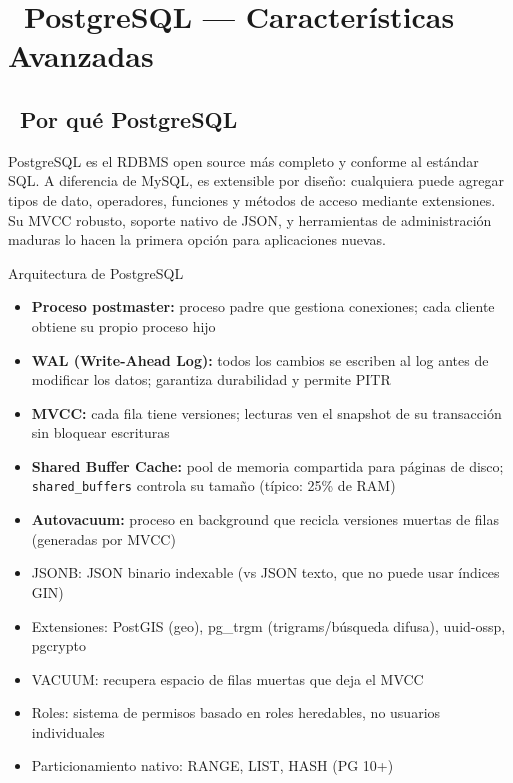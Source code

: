 \chapter[PostgreSQL --- Características Avanzadas]{~PostgreSQL --- Características Avanzadas}

\section[Por qué PostgreSQL]{~Por qué PostgreSQL}

PostgreSQL es el RDBMS open source más completo y conforme al estándar SQL.
A diferencia de MySQL, es extensible por diseño: cualquiera puede agregar tipos de dato, operadores, funciones y métodos de acceso mediante extensiones.
Su MVCC robusto, soporte nativo de JSON, y herramientas de administración maduras lo hacen la primera opción para aplicaciones nuevas.

\begin{teoriabox}{Arquitectura de PostgreSQL}
\begin{itemize}
  \item \textbf{Proceso postmaster:} proceso padre que gestiona conexiones; cada cliente obtiene su propio proceso hijo
  \item \textbf{WAL (Write-Ahead Log):} todos los cambios se escriben al log antes de modificar los datos; garantiza durabilidad y permite PITR
  \item \textbf{MVCC:} cada fila tiene versiones; lecturas ven el snapshot de su transacción sin bloquear escrituras
  \item \textbf{Shared Buffer Cache:} pool de memoria compartida para páginas de disco; \texttt{shared\_buffers} controla su tamaño (típico: 25\% de RAM)
  \item \textbf{Autovacuum:} proceso en background que recicla versiones muertas de filas (generadas por MVCC)
\end{itemize}
\end{teoriabox}

\begin{itemize}
  \item JSONB: JSON binario indexable (vs JSON texto, que no puede usar índices GIN)
  \item Extensiones: PostGIS (geo), pg\_trgm (trigrams/búsqueda difusa), uuid-ossp, pgcrypto
  \item VACUUM: recupera espacio de filas muertas que deja el MVCC
  \item Roles: sistema de permisos basado en roles heredables, no usuarios individuales
  \item Particionamiento nativo: RANGE, LIST, HASH (PG 10+)
\end{itemize}


